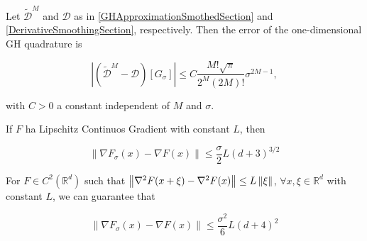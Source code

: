\begin{thm}\label{GHError}

Let $\widetilde{\mathcal{D}}^{M}$ and $\mathcal{D}$ as in \ref{GHApproximationSmothedSection} and \ref{DerivativeSmoothingSection}, respectively. Then the error of the one-dimensional GH quadrature is

\begin{equation}\label{BoundErrorGHEq}
\left|\left(\widetilde{\mathcal{D}}^{M}-\mathcal{D}\right)\left[G_{\sigma}\right]\right| \leq C \frac{M ! \sqrt{\pi}}{2^{M}(2 M) !} \sigma^{2 M-1},   
\end{equation}

with $C>0$ a constant independent of $M$ and $\sigma$.

\end{thm}

\begin{prop}\label{PrimoLemmaNesterov}
If $ F $ ha Lipschitz Continuos Gradient with constant $ L $, then

\begin{equation}
\left\|\nabla F_{\sigma}(x)-\nabla F(x)\right\| \leq \frac{\sigma}{2} L(d+3)^{3 / 2}
\end{equation}

For $ F \in C^{2}(\mathbb{R}^d) $ such that $\left\lVert\nabla^2 F(x+\xi) - \nabla^2 F(x)\right\rVert \leq L \left\lVert\xi\right\rVert$, $\forall x, \xi \in \mathbb{R}^d$ with constant $ L $, we can guarantee that

\begin{equation}
\left\|\nabla F_{\sigma}(x)-\nabla F(x)\right\| \leq \frac{\sigma^{2}}{6} L(d+4)^{2}
\end{equation}

\end{prop}

